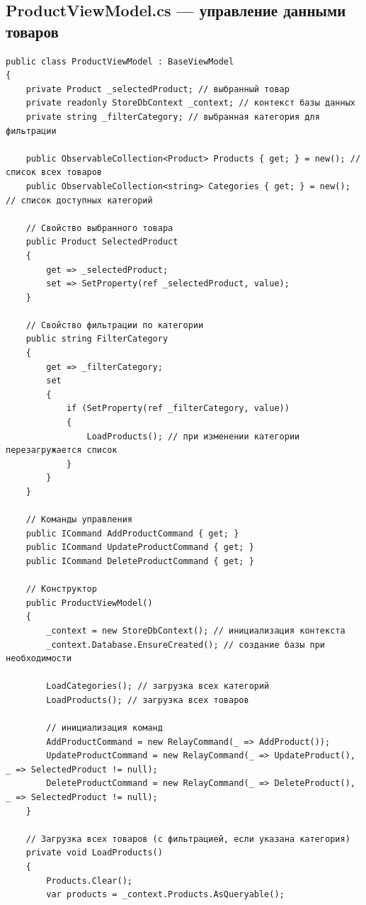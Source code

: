 \documentclass[12pt]{article}
\renewcommand{\texttt}[1]{{\small\ttfamily #1}}
\newenvironment{code}{\captionsetup{type=listing}}{}
\numberwithin{listing}{section}
\numberwithin{figure}{section}
\begin{document}
\subsection{\texttt{ProductViewModel.cs} — управление данными товаров}
\begin{code}
	\begin{verbatim}
public class ProductViewModel : BaseViewModel
{
    private Product _selectedProduct; // выбранный товар
    private readonly StoreDbContext _context; // контекст базы данных
    private string _filterCategory; // выбранная категория для фильтрации

    public ObservableCollection<Product> Products { get; } = new(); // список всех товаров
    public ObservableCollection<string> Categories { get; } = new(); // список доступных категорий

    // Свойство выбранного товара
    public Product SelectedProduct
    {
        get => _selectedProduct;
        set => SetProperty(ref _selectedProduct, value);
    }

    // Свойство фильтрации по категории
    public string FilterCategory
    {
        get => _filterCategory;
        set
        {
            if (SetProperty(ref _filterCategory, value))
            {
                LoadProducts(); // при изменении категории перезагружается список
            }
        }
    }

    // Команды управления
    public ICommand AddProductCommand { get; }
    public ICommand UpdateProductCommand { get; }
    public ICommand DeleteProductCommand { get; }

    // Конструктор
    public ProductViewModel()
    {
        _context = new StoreDbContext(); // инициализация контекста
        _context.Database.EnsureCreated(); // создание базы при необходимости

        LoadCategories(); // загрузка всех категорий
        LoadProducts(); // загрузка всех товаров

        // инициализация команд
        AddProductCommand = new RelayCommand(_ => AddProduct());
        UpdateProductCommand = new RelayCommand(_ => UpdateProduct(), _ => SelectedProduct != null);
        DeleteProductCommand = new RelayCommand(_ => DeleteProduct(), _ => SelectedProduct != null);
    }

    // Загрузка всех товаров (с фильтрацией, если указана категория)
    private void LoadProducts()
    {
        Products.Clear();
        var products = _context.Products.AsQueryable();


\end{verbatim}
\end{code}
\end{document}
